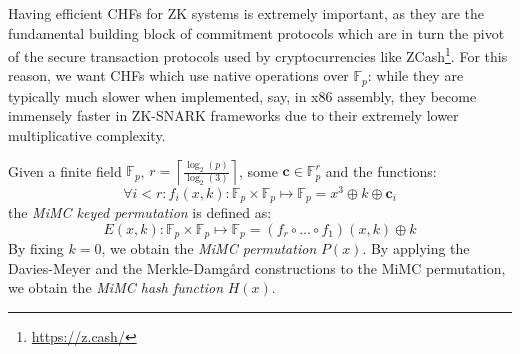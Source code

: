 \noindent Having efficient CHFs for ZK systems is extremely important, as they are the fundamental
building block of commitment protocols which are in turn the pivot of the secure transaction
protocols used by cryptocurrencies like ZCash\footnote{\url{https://z.cash/}}.
For this reason, we want CHFs which use native operations over \(\mathbb{F}_p\):
while they are typically much slower when implemented, say, in x86 assembly, they become
immensely faster in ZK-SNARK frameworks due to their extremely lower multiplicative complexity.
\begin{definition}
	Given a finite field \(\mathbb{F}_p\),
	\(r = \left\lceil{\frac{\log_2\left(p\right)}{\log_2\left(3\right)}}\right\rceil \), some
	\(\bm{c} \in \mathbb{F}_p^r\) and the functions:
	\[\forall i < r\colon f_i\left(x,k\right)\colon \mathbb{F}_p \times \mathbb{F}_p \mapsto
		\mathbb{F}_p = x^3 \oplus k \oplus \bm{c}_i\]
	the \emph{MiMC keyed permutation} is defined as:
	\[E\left(x, k\right)\colon \mathbb{F}_p \times \mathbb{F}_p \mapsto \mathbb{F}_p =
		\left(f_{r} \circ \dots \circ f_1\right)\left(x, k\right) \oplus k\]
	By fixing \(k = 0\), we obtain the \emph{MiMC permutation} \(P\left(x\right)\).
	By applying the Davies-Meyer and the Merkle-Damg\r{a}rd constructions to the MiMC permutation, we 
	obtain the \emph{MiMC hash function} \(H\left(x\right)\).
\end{definition}
